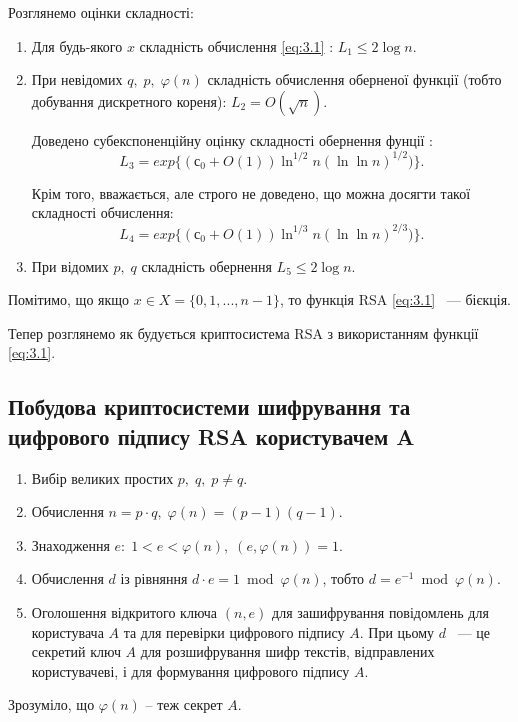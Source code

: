 \pagebreak 

Розглянемо оцінки складності:
\begin{enumerate}

\item Для будь-якого $x$ складність обчислення \eqref{eq:3.1} :  $L_{1} \leq 2 \log {n}$.

\item При невідомих $q, \; p,\;\varphi  (n)$ складність обчислення оберненої функції (тобто добування дискретного кореня): $L_{2} = O(\sqrt n)$.

Доведено субекспоненційну оцінку складності обернення фунції :
\[ L_{3} = exp\{ (  \mbox{с}_{0} + O(1)) \ln ^{1/2} n (\ln\ln n) ^ {1/2}) \}. \]

Крім того, вважається, але строго не доведено, що можна досягти такої складності обчислення:
\[ 
L_{4} = exp\{ (  \mbox{с}_{0} + O(1)) \ln ^{1/3} n (\ln\ln n) ^ {2/3}) \}.
\]

\item При відомих $p,\;q$ складність обернення $L_{5} \leq 2 \log n$.

\end{enumerate}

Помітимо, що якщо $x \in X = \{ 0, 1, ..., n-1 \}$, то функція RSA \eqref{eq:3.1} ~--- бієкція.

Тепер розглянемо як будується криптосистема RSA з використанням функції \eqref{eq:3.1}.

\subsection{Побудова криптосистеми шифрування та цифрового підпису RSA користувачем A}

\begin{enumerate}
\item Вибір великих простих $p,\; q,\; p \neq q$.

\item Обчислення $n = p \cdot q, \; \varphi(n)=(p-1)(q-1)$.

\item Знаходження $e:\;1<e<\varphi(n),\;(e,\varphi(n))=1$.

\item Обчислення $d$ із рівняння $d \cdot e = 1 \bmod \varphi(n)$, тобто $d = e ^{-1} \bmod \varphi(n)$.

\item Оголошення відкритого ключа $(n,e)$ для зашифрування повідомлень для користувача $A$ та для перевірки цифрового підпису $A$.
При цьому $d$ ~--- це секретий ключ $A$ для розшифрування шифр текстів, відправлених користувачеві, і для формування цифрового підпису $A$.

\end{enumerate}
Зрозуміло, що $\varphi (n)$ -- теж секрет $A$.

